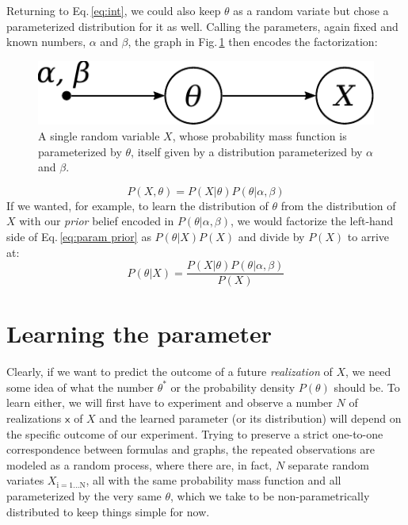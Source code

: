 \documentclass[]{report}
\begin{document}
Returning to Eq.\,\ref{eq:int}, we could also keep $\theta$ as a random variate but chose a parameterized distribution for it as well. Calling the parameters, again fixed and known numbers, $\alpha$ and $\beta$, the graph in Fig.\,\ref{fig:1var1param2const} then encodes the factorization:
\begin{figure}[h]
	\centering
	\includegraphics[scale=0.5]{1var_1param_2const}
	\caption{A single random variable $X$, whose probability mass function is parameterized by $\theta$, itself given by a distribution parameterized by $\alpha$ and $\beta$.}
	\label{fig:1var1param2const}
\end{figure}
\begin{equation} \label{eq:param prior}
P( X, \theta )
=
P( X | \theta )
P( \theta | \alpha, \beta )
\end{equation}
If we wanted, for example, to learn the distribution of $\theta$ from the distribution of $X$ with our \emph{prior} belief encoded in $P( \theta | \alpha, \beta ) $, we would factorize the left-hand side of Eq.\,\ref{eq:param prior} as $P( \theta | X ) P(X) $ and divide by $P(X)$ to arrive at:
\begin{equation} \label{eq:bayes}
P( \theta | X ) = 
\frac
	{
		P(X|\theta)
		P(\theta|\alpha, \beta)
	}
	{
		P(X)
	}
\end{equation}


\section{Learning the parameter} \label{sect:learn_param}
Clearly, if we want to predict the outcome of a future \emph{realization} of $X$, we need some idea of what the number $\theta^*$ or the probability density $P(\theta)$ should be. To learn either, we will first have to experiment and observe a number $N$ of realizations $\mathsf{x}$ of $X$ and the learned parameter (or its distribution) will depend on the specific outcome of our experiment. Trying to preserve a strict one-to-one correspondence between formulas and graphs, the repeated observations are modeled as a random process, where there are, in fact, $N$ separate random variates $X_\mathrm{i=1 \ldots N}$, all with the same probability mass function and all parameterized by the very same $\theta$, which we take to be non-parametrically distributed to keep things simple for now.
\end{document}
